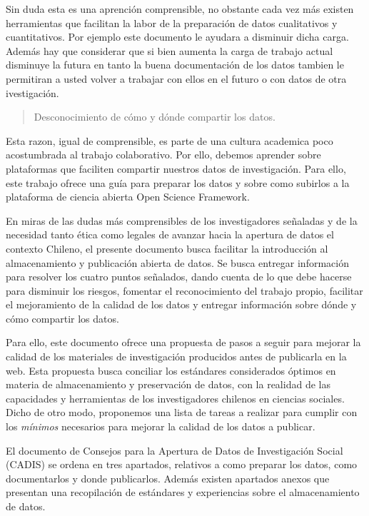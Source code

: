 \documentclass[
  14pt,
]{book}
\begin{document}
Sin duda esta es una aprención comprensible, no obstante cada vez más existen herramientas que facilitan la labor de la preparación de datos cualitativos y cuantitativos. Por ejemplo este documento le ayudara a disminuir dicha carga. Además hay que considerar que si bien aumenta la carga de trabajo actual disminuye la futura en tanto la buena documentación de los datos tambien le permitiran a usted volver a trabajar con ellos en el futuro o con datos de otra ivestigación.

\begin{quote}
Desconocimiento de cómo y dónde compartir los datos.
\end{quote}

Esta razon, igual de comprensible, es parte de una cultura academica poco acostumbrada al trabajo colaborativo. Por ello, debemos aprender sobre plataformas que faciliten compartir nuestros datos de investigación. Para ello, este trabajo ofrece una guía para preparar los datos y sobre como subirlos a la plataforma de ciencia abierta Open Science Framework.

En miras de las dudas más comprensibles de los investigadores señaladas \citep{ferguson_How_2014, sharan_Ten_2020} y de la necesidad tanto ética como legales de avanzar hacia la apertura de datos el contexto Chileno, el presente documento busca facilitar la introducción al almacenamiento y publicación abierta de datos. Se busca entregar información para resolver los cuatro puntos señalados, dando cuenta de lo que debe hacerse para disminuir los riesgos, fomentar el reconocimiento del trabajo propio, facilitar el mejoramiento de la calidad de los datos y entregar información sobre dónde y cómo compartir los datos.

Para ello, este documento ofrece una propuesta de pasos a seguir para mejorar la calidad de los materiales de investigación producidos antes de publicarla en la web. Esta propuesta busca conciliar los estándares considerados óptimos en materia de almacenamiento y preservación de datos, con la realidad de las capacidades y herramientas de los investigadores chilenos en ciencias sociales. Dicho de otro modo, proponemos una lista de tareas a realizar para cumplir con los \emph{mínimos} necesarios para mejorar la calidad de los datos a publicar.

El documento de Consejos para la Apertura de Datos de Investigación Social (CADIS) se ordena en tres apartados, relativos a como preparar los datos, como documentarlos y donde publicarlos. Además existen apartados anexos que presentan una recopilación de estándares y experiencias sobre el almacenamiento de datos.
\end{document}
